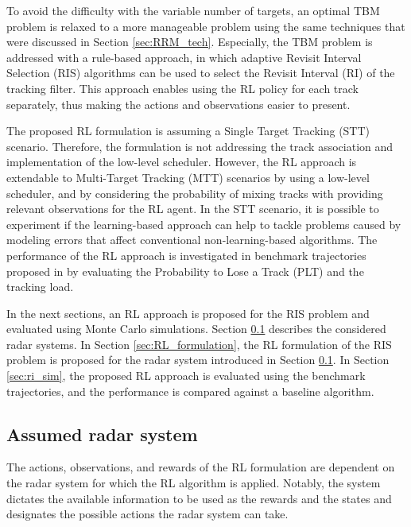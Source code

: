 \documentclass[english, 12pt, a4paper, elec, utf8, a-1b, online]{aaltothesis}
\begin{document}
To avoid the difficulty with the variable number of targets, an optimal TBM problem is relaxed to a more manageable problem using the same techniques that were discussed in Section \ref{sec:RRM_tech}.
Especially, the TBM problem is addressed with a rule-based approach, in which adaptive Revisit Interval Selection (RIS) algorithms can be used to select the Revisit Interval (RI) of the tracking filter.
This approach enables using the RL policy for each track separately, thus making the actions and observations easier to present.

The proposed RL formulation is assuming a Single Target Tracking (STT) scenario. 
Therefore, the formulation is not addressing the track association and implementation of the low-level scheduler.
However, the RL approach is extendable to Multi-Target Tracking (MTT) scenarios by using a low-level scheduler, and by considering the probability of mixing tracks with providing relevant observations for the RL agent.
In the STT scenario, it is possible to experiment if the learning-based approach can help to tackle problems caused by modeling errors that affect conventional non-learning-based algorithms.
The performance of the RL approach is investigated in benchmark trajectories proposed in \cite{Blair1998} by evaluating the Probability to Lose a Track (PLT) and the tracking load.

In the next sections, an RL approach is proposed for the RIS problem and evaluated using Monte Carlo simulations.
Section \ref{sec:system_description} describes the considered radar systems.
In Section \ref{sec:RL_formulation}, the RL formulation of the RIS problem is proposed for the radar system introduced in Section \ref{sec:system_description}.
In Section \ref{sec:ri_sim}, the proposed RL approach is evaluated using the benchmark trajectories, and the performance is compared against a baseline algorithm.


\subsection{Assumed radar system} \label{sec:system_description}

The actions, observations, and rewards of the RL formulation are dependent on the radar system for which the RL algorithm is applied.
Notably, the system dictates the available information to be used as the rewards and the states and designates the possible actions the radar system can take.
 
\end{document}
